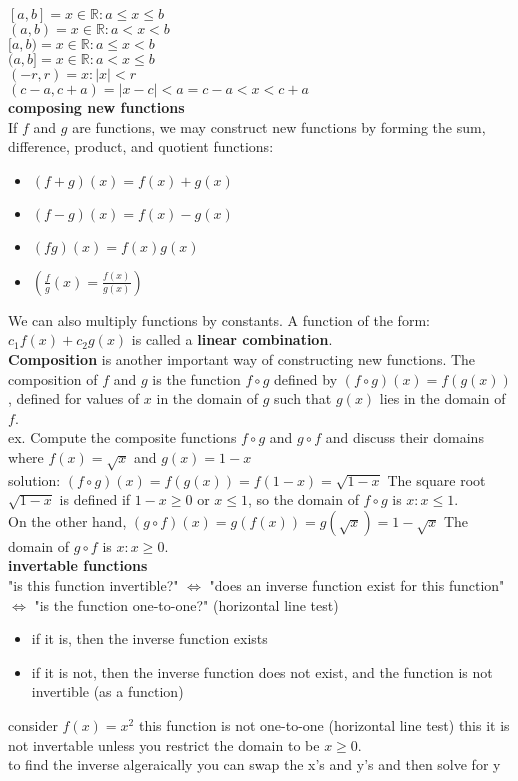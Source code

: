 \documentclass{article}
\begin{document}
$[a, b] = {x \in \mathbb{R} : a \leq x \leq b}$\\
$(a, b) = {x \in \mathbb{R} : a < x < b}$\\
$[a, b) = {x \in \mathbb{R} : a \leq x < b}$\\
$(a, b] = {x \in \mathbb{R} : a < x \leq b}$\\
$(-r, r) = {x : \lvert x\rvert < r}$\\
$(c - a, c + a) = {\lvert x - c\rvert < a} = c - a < x < c + a$\\

\textbf{composing new functions}\\
	If $f$ and $g$ are functions, we may construct new functions by forming the sum, difference, product, and quotient functions:\\
	\begin{itemize}
		\item $(f + g)(x) = f(x) + g(x)$
		\item $(f - g)(x) = f(x) - g(x)$
		\item $(fg)(x) = f(x)g(x)$
		\item $(\frac{f}{g}(x) = \frac{f(x)}{g(x)})$
	\end{itemize}
	We can also multiply functions by constants. A function of the form: $c_1f(x) + c_2g(x)$ is called a \textbf{linear combination}.\\
	\textbf{Composition} is another important way of constructing new functions. The composition of $f$ and $g$ is the function $f \circ g$ defined by $(f \circ g)(x) = f(g(x))$, defined for values of $x$ in the domain of $g$ such that $g(x)$ lies in the domain of $f$.\\
	ex. Compute the composite functions $f \circ g$ and $g \circ f$ and discuss their domains where $f(x) = \sqrt{x}$ and $g(x) = 1 - x$\\
	solution: $(f \circ g)(x) = f(g(x)) = f(1 - x) = \sqrt{1 - x}$ The square root $\sqrt{1 - x}$ is defined if $1 - x \geq 0$ or $x \leq 1$, so the domain of $f \circ g$ is ${x : x \leq 1}$.\\
	On the other hand, $(g \circ f)(x) = g(f(x)) = g(\sqrt{x}) = 1 - \sqrt{x}$ The domain of $g \circ f$ is ${x : x \geq 0}$.\\

\textbf{invertable functions}\\
	"is this function invertible?" $\Leftrightarrow$ "does an inverse function exist for this function" $\Leftrightarrow$ "is the function one-to-one?" (horizontal line test)
	\begin{itemize}
		\item if it is, then the inverse function exists
		\item if it is not, then the inverse function does not exist, and the function is not invertible (as a function)
	\end{itemize}
	consider $f(x) = x^2$ this function is not one-to-one (horizontal line test) this it is not invertable unless you restrict the domain to be $x \geq 0$.\\
	to find the inverse algeraically you can swap the x's and y's and then solve for y\\
\end{document}
